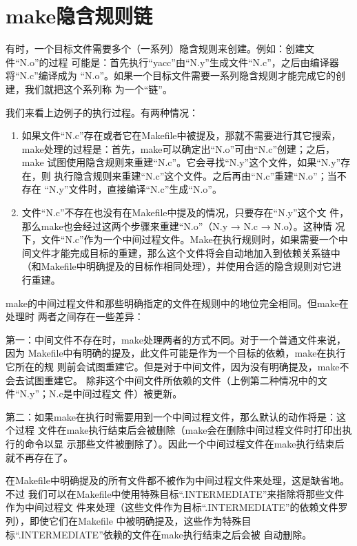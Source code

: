 \section{make隐含规则链}
有时，一个目标文件需要多个（一系列）隐含规则来创建。例如：创建文件“N.o”的过程
可能是：首先执行“yacc”由“N.y”生成文件“N.c”，之后由编译器将“N.c”编译成为
“N.o”。如果一个目标文件需要一系列隐含规则才能完成它的创建，我们就把这个系列称
为一个“链”。

我们来看上边例子的执行过程。有两种情况：

\vspace{-5pt}
\begin{enumerate}
\itemsep=0pt

  \item 如果文件“N.c”存在或者它在Makefile中被提及，那就不需要进行其它搜索，
      make处理的过程是：首先，make可以确定出“N.o”可由“N.c”创建；之后，make
      试图使用隐含规则来重建“N.c”。它会寻找“N.y”这个文件，如果“N.y”存在，则
      执行隐含规则来重建“N.c”这个文件。之后再由“N.c”重建“N.o”；当不存在
      “N.y”文件时，直接编译“N.c”生成“N.o”。
  \item 文件“N.c”不存在也没有在Makefile中提及的情况，只要存在“N.y”这个文
      件，那么make也会经过这两个步骤来重建“N.o”（N.y → N.c → N.o）。这种情
      况下，文件“N.c”作为一个中间过程文件。Make在执行规则时，如果需要一个中
      间文件才能完成目标的重建，那么这个文件将会自动地加入到依赖关系链中
      （和Makefile中明确提及的目标作相同处理），并使用合适的隐含规则对它进
      行重建。
\end{enumerate}
\vspace{-5pt}

make的中间过程文件和那些明确指定的文件在规则中的地位完全相同。但make在处理时
两者之间存在一些差异：

第一：中间文件不存在时，make处理两者的方式不同。对于一个普通文件来说，因为
Makefile中有明确的提及，此文件可能是作为一个目标的依赖，make在执行它所在的规
则前会试图重建它。但是对于中间文件，因为没有明确提及，make不会去试图重建它。
除非这个中间文件所依赖的文件（上例第二种情况中的文件“N.y”；N.c是中间过程文
件）被更新。

第二：如果make在执行时需要用到一个中间过程文件，那么默认的动作将是：这个过程
文件在make执行结束后会被删除（make会在删除中间过程文件时打印出执行的命令以显
示那些文件被删除了）。因此一个中间过程文件在make执行结束后就不再存在了。

在Makefile中明确提及的所有文件都不被作为中间过程文件来处理，这是缺省地。不过
我们可以在Makefile中使用特殊目标“.INTERMEDIATE”来指除将那些文件作为中间过程文
件来处理（这些文件作为目标“.INTERMEDIATE”的依赖文件罗列），即使它们在Makefile
中被明确提及，这些作为特殊目标“.INTERMEDIATE”依赖的文件在make执行结束之后会被
自动删除。

